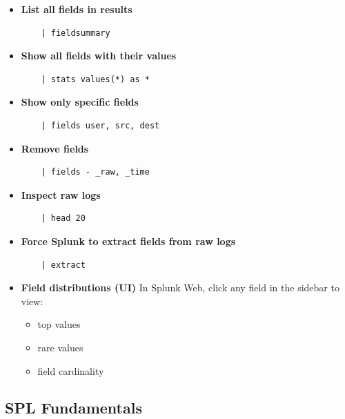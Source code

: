 \begin{itemize}
    \item \textbf{List all fields in results}
    \begin{lstlisting}
    | fieldsummary
    \end{lstlisting}

    \item \textbf{Show all fields with their values}
    \begin{lstlisting}
    | stats values(*) as *
    \end{lstlisting}

    \item \textbf{Show only specific fields}
    \begin{lstlisting}
    | fields user, src, dest
    \end{lstlisting}

    \item \textbf{Remove fields}
    \begin{lstlisting}
    | fields - _raw, _time
    \end{lstlisting}

    \item \textbf{Inspect raw logs}
    \begin{lstlisting}
    | head 20
    \end{lstlisting}

    \item \textbf{Force Splunk to extract fields from raw logs}
    \begin{lstlisting}
    | extract
    \end{lstlisting}

    \item \textbf{Field distributions (UI)}
    In Splunk Web, click any field in the sidebar to view:
    \begin{itemize}
        \item top values
        \item rare values
        \item field cardinality
    \end{itemize}
\end{itemize}


\subsection*{SPL Fundamentals}

